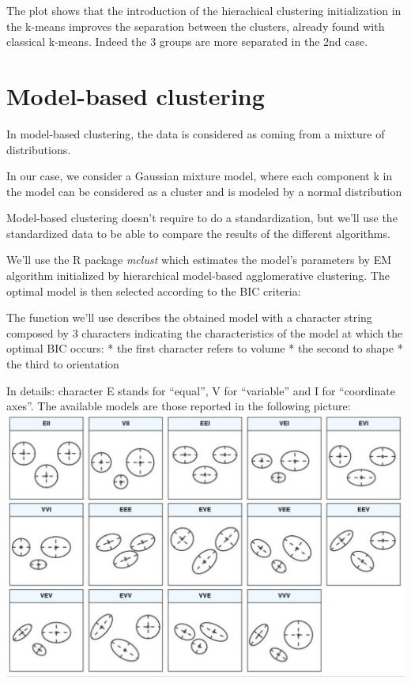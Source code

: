 \documentclass[
]{article}
\begin{document}
The plot shows that the introduction of the hierachical clustering
initialization in the k-means improves the separation between the
clusters, already found with classical k-means. Indeed the 3 groups are
more separated in the 2nd case.

\hypertarget{model-based-clustering}{%
\section{Model-based clustering}\label{model-based-clustering}}

In model-based clustering, the data is considered as coming from a
mixture of distributions.

In our case, we consider a Gaussian mixture model, where each component
k in the model can be considered as a cluster and is modeled by a normal
distribution

Model-based clustering doesn't require to do a standardization, but
we'll use the standardized data to be able to compare the results of the
different algorithms.

We'll use the R package \emph{mclust} which estimates the model's
parameters by EM algorithm initialized by hierarchical model-based
agglomerative clustering. The optimal model is then selected according
to the BIC criteria:

The function we'll use describes the obtained model with a character
string composed by 3 characters indicating the characteristics of the
model at which the optimal BIC occurs: * the first character refers to
volume * the second to shape * the third to orientation

In details: character E stands for ``equal'', V for ``variable'' and I
for ``coordinate axes''. The available models are those reported in the
following picture: \includegraphics{mclust.png}
\end{document}
